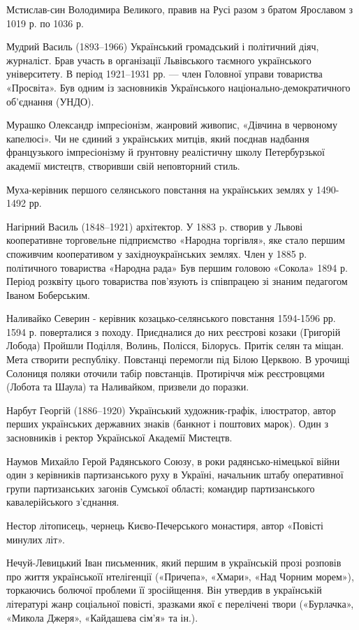 Мстислав-син Володимира Великого, правив на Русі разом з братом Ярославом з 1019 р. по 1036 р.

Мудрий Василь (1893–1966) Український громадський і політичний діяч, журналіст. Брав участь в організації Львівського таємного українського університету. В період 1921–1931 рр. — член Головної управи товариства «Просвіта». Був одним із засновників Українського національно-демократичного об’єднання (УНДО).

Мурашко Олександр  імпресіонізм, жанровий живопис, «Дівчина в червоному капелюсі». Чи не єдиний з українських митців, який поєднав надбання французького імпресіонізму й ґрунтовну реалістичну школу Петербурзької академії мистецтв, створивши свій неповторний стиль. 

Муха-керівник першого селянського повстання на українських землях у 1490-1492 рр.

Нагірний Василь (1848–1921) архітектор. У 1883 p. створив у Львові кооперативне торговельне підприємство «Народна торгівля», яке стало першим споживчим кооперативом у західноукраїнських землях. Член у 1885 р. політичного товариства «Народна рада» Був першим головою «Сокола» 1894 р. Період розквіту цього товариства пов’язують із співпрацею зі знаним педагогом Іваном Боберським.

Наливайко Северин  - керівник козацько-селянського повстання 1594-1596 рр. 1594 р. поверталися з походу. Приєдналися до них реєстрові козаки (Григорій Лобода) Пройшли Поділля, Волинь, Полісся, Білорусь. Притік селян та міщан. Мета створити республіку. Повстанці перемогли під Білою Церквою. В урочищі Солониця поляки оточили табір повстанців. Протиріччя між реєстровцями (Лобота та Шаула) та Наливайком, призвели до поразки.

Нарбут Георгій (1886–1920) Український художник-графік, ілюстратор, автор перших українських державних знаків (банкнот і поштових марок). Один з засновників і ректор Української Академії Мистецтв.

Наумов Михайло Герой Радянського Союзу, в роки радянсько-німецької війни один з керівників партизанського руху в Україні, начальник штабу оперативної групи партизанських загонів Сумської області; командир партизанського кавалерійського з'єднання.

Нестор літописець, чернець Києво-Печерського монастиря, автор «Повісті минулих літ».

Нечуй-Левицький Іван письменник, який першим в українській прозі розповів про життя українськоїї нтелігенції («Причепа», «Хмари», «Над Чорним морем»), торкаючись болючої проблеми її зросійщення. Він утвердив в українській літературі жанр соціальної повісті, зразками якої є перелічені твори («Бурлачка», «Микола Джеря», «Кайдашева сім’я» та ін.). 

